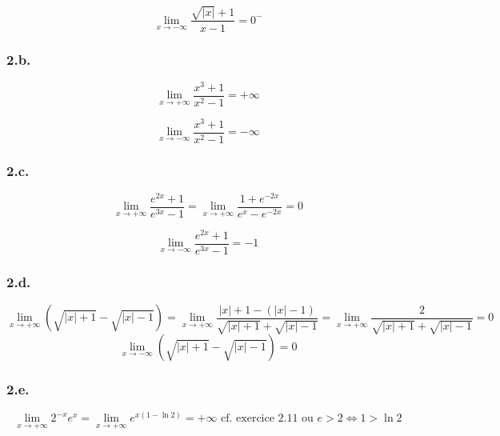 \documentclass{report}
\begin{document}
\begin{displaymath}
	\lim_{x \rightarrow -\infty} \frac{\sqrt{|x|}+1}{x-1} = 0^{-}
\end{displaymath}

\subsubsection*{2.b.}
\begin{displaymath}
	\lim_{x \rightarrow +\infty} \frac{x^3+1}{x^2-1} = +\infty
\end{displaymath}

\begin{displaymath}
	\lim_{x \rightarrow -\infty} \frac{x^3+1}{x^2-1} = -\infty
\end{displaymath}

\subsubsection*{2.c.}
\begin{displaymath}
	\lim_{x \rightarrow +\infty} \frac{e^{2x}+1}{e^{3x}-1} = \lim_{x \rightarrow +\infty} \frac{1+ e^{-2x}}{e^{x}-e^{-2x}} = 0
\end{displaymath}

\begin{displaymath}
	\lim_{x \rightarrow -\infty} \frac{e^{2x}+1}{e^{3x}-1} = -1
\end{displaymath}


\subsubsection*{2.d.}
\begin{displaymath}
	\lim_{x \rightarrow +\infty} \left( \sqrt{|x|+1} - \sqrt{|x|-1} \right)
		= \lim_{x \rightarrow +\infty} \frac{|x|+1-(|x|-1)}{\sqrt{|x|+1} + \sqrt{|x|-1}} = \lim_{x \rightarrow +\infty} \frac{2}{\sqrt{|x|+1} + \sqrt{|x|-1}} = 0
\end{displaymath}
\begin{displaymath}
	\lim_{x \rightarrow -\infty} \left( \sqrt{|x|+1} - \sqrt{|x|-1} \right) = 0
\end{displaymath}

\subsubsection*{2.e.}
\begin{displaymath}
	\lim_{x \rightarrow +\infty} 2^{-x}e^x = \lim_{x \rightarrow +\infty} e^{x(1-\ln 2)} = +\infty \text{ cf. exercice 2.11 ou } e>2 \Longleftrightarrow 1 > \ln 2
\end{displaymath}
\end{document}
